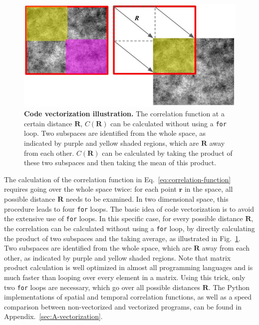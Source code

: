\begin{figure}[!ht]
	\begin{center}
	\includegraphics[width=5.5in]{Figs/2-Exp/vectorization.pdf}
	\end{center}
	\caption[Code vectorization illustration]
	{
	\textbf{Code vectorization illustration.}
	The correlation function at a certain distance $\bm{R}$, $C(\bm{R})$ can be calculated without using a \texttt{for} loop. Two subspaces are identified from the whole space, as indicated by purple and yellow shaded regions, which are $\bm{R}$ away from each other. $C(\bm{R})$ can be calculated by taking the product of these two subspaces and then taking the mean of this product.
	}
	\label{fig:vectorization}
\end{figure}


The calculation of the correlation function in Eq.~\ref{eq:correlation-function} requires going over the whole space twice: for each point $\bm{r}$ in the space, all possible distance $\bm{R}$ needs to be examined. In two dimensional space, this procedure leads to four \texttt{for} loops. The basic idea of code vectorization is to avoid the extensive use of \texttt{for} loops. In this specific case, for every possible distance $\bm{R}$, the correlation can be calculated without using a \texttt{for} loop, by directly calculating the product of two subspaces and the taking average, as illustrated in Fig.~\ref{fig:vectorization}. Two subspaces are identified from the whole space, which are $\bm{R}$ away from each other, as indicated by purple and yellow shaded regions. Note that matrix product calculation is well optimized in almost all programming languages and is much faster than looping over every element in a matrix. Using this trick, only two \texttt{for} loops are necessary, which go over all possible distances $\bm{R}$. The Python implementations of spatial and temporal correlation functions, as well as a speed comparison between non-vectorized and vectorized programs, can be found in Appendix.~\ref{sec:A-vectorization}.

